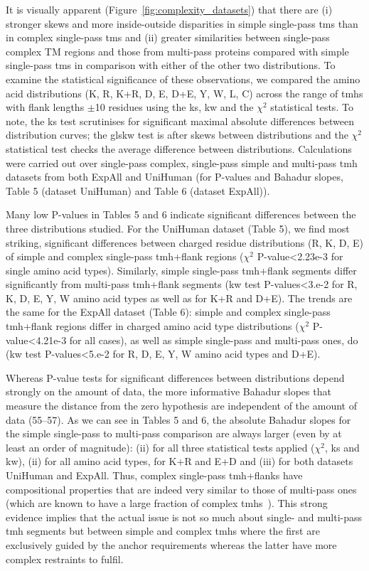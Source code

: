 It is visually apparent (Figure~\ref{fig:complexity_datasets}) that there are (i) stronger skews and more inside-outside disparities in simple single-pass \gls{tm}s than in complex single-pass \gls{tm}s and (ii) greater similarities between single-pass complex TM regions and those from multi-pass proteins compared with simple single-pass \gls{tm}s in comparison with either of the other two distributions. To examine the statistical significance of these observations, we compared the amino acid distributions (K, R, K+R, D, E, D+E, Y, W, L, C) across the range of \gls{tmh}s with flank lengths $\pm$10 residues using the \gls{ks}, \gls{kw} and the \({\chi}^{2}\) statistical tests. To note, the \gls{ks} test scrutinises for significant maximal absolute differences between distribution curves; the gls{kw} test is after skews between distributions and the \({\chi}^{2}\) statistical test checks the average difference between distributions. Calculations were carried out over single-pass complex, single-pass simple and multi-pass \gls{tmh} datasets from both ExpAll and UniHuman (for P-values and Bahadur slopes, Table 5 (dataset UniHuman) and Table 6 (dataset ExpAll)).

Many low P-values in Tables 5 and 6 indicate significant differences between the three distributions studied. For the UniHuman dataset (Table 5), we find most striking, significant differences between charged residue distributions (R, K, D, E) of simple and complex single-pass \gls{tmh}+flank regions (\({\chi}^{2}\) P-value<2.23e-3 for single amino acid types). Similarly, simple single-pass \gls{tmh}+flank segments differ significantly from multi-pass \gls{tmh}+flank segments (\gls{kw} test P-values<3.e-2 for R, K, D, E, Y, W amino acid types as well as for K+R and D+E). The trends are the same for the ExpAll dataset (Table 6): simple and complex single-pass \gls{tmh}+flank regions differ in charged amino acid type distributions (\({\chi}^{2}\) P-value<4.21e-3 for all cases), as well as simple single-pass and multi-pass ones, do (\gls{kw} test P-values<5.e-2 for R, D, E, Y, W amino acid types and D+E).

Whereas P-value tests for significant differences between distributions depend strongly on the amount of data, the more informative Bahadur slopes that measure the distance from the zero hypothesis are independent of the amount of data (55--57). As we can see in Tables 5 and 6, the absolute Bahadur slopes for the simple single-pass to multi-pass comparison are always larger (even by at least an order of magnitude): (ii) for all three statistical tests applied (\({\chi}^{2}\), \gls{ks} and \gls{kw}), (ii) for all amino acid types, for K+R and E+D and (iii) for both datasets UniHuman and ExpAll. Thus, complex single-pass \gls{tmh}+flanks have compositional properties that are indeed very similar to those of multi-pass ones (which are known to have a large fraction of complex \gls{tmh}s~\cite{Wong2011, Wong2012}). This strong evidence implies that the actual issue is not so much about single- and multi-pass \gls{tmh} segments but between simple and complex \gls{tmh}s where the first are exclusively guided by the anchor requirements whereas the latter have more complex restraints to fulfil.

